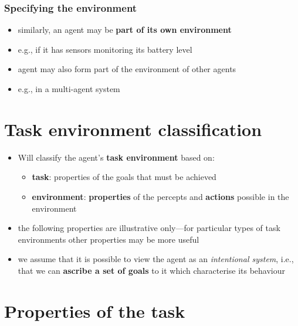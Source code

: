 \documentclass{article}
\begin{document}
\subsubsection{Specifying the environment}
\begin{itemize}
  \item similarly, an agent may be \textbf{part of its own environment}
  \item e.g., if it has sensors monitoring its battery level 
  \item agent may also form part of the environment of other agents 
  \item e.g., in a multi-agent system
\end{itemize}

\section{Task environment classification}
\begin{itemize}
  \item Will classify the agent’s \textbf{task environment} based on:
  \begin{itemize}
    \item \textbf{task}: properties of the goals that must be achieved
    \item \textbf{environment}: \textbf{properties} of the percepts and \textbf{actions} possible in the environment 
  \end{itemize}
  \item the following properties are illustrative only—for particular types of task environments other properties may be more useful
  \item we assume that it is possible to view the agent as an \textit{intentional system}, i.e., that we can \textbf{ascribe a set of goals} to it which characterise its behaviour
\end{itemize}

\section{Properties of the task}
\end{document}
